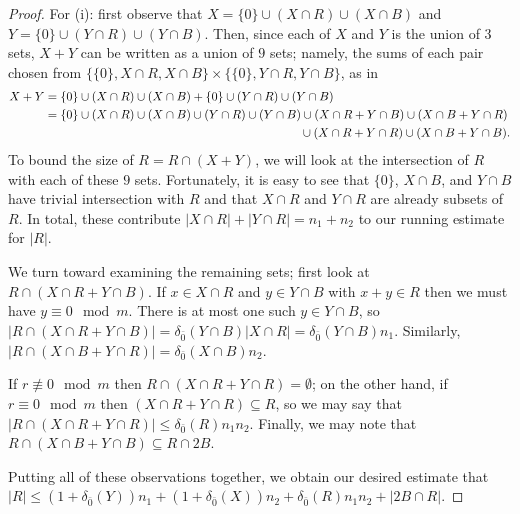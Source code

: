 \begin{proof}
For (i): first observe that $X = \{0\}\cup (X\cap R) \cup (X\cap B)$ and $Y = \{0\}\cup (Y\cap R) \cup (Y\cap B)$.
Then, since each of $X$ and $Y$ is the union of $3$ sets, $X+Y$ can be written as a union of $9$ sets; namely, the sums of each pair chosen from $\{\{0\}, X\cap R, X\cap B\} \times \{ \{0\}, Y\cap R, Y\cap B\}$, as in
\begin{align*}
X+Y &= \{0\}\cup (X\cap R) \cup (X\cap B) + \{0\} \cup (Y\cap R) \cup (Y\cap B) \\
&= \{0\}\cup (X\cap R) \cup (X\cap B) \cup (Y\cap R) \cup (Y\cap B) \cup (X\cap R + Y\cap B) \cup (X\cap B + Y\cap R)\\
& \hspace{7.5cm} \hfill \cup (X\cap R + Y\cap R) \cup (X\cap B + Y\cap B).
\end{align*}
To bound the size of $R = R\cap (X+Y)$, we will look at the intersection of $R$ with each of these $9$ sets.  
Fortunately, it is easy to see that $\{0\}$, $X\cap B$, and $Y\cap B$ have trivial intersection with $R$ and that $X\cap R$ and $Y\cap R$ are already subsets of $R$.
In total, these contribute $|X\cap R| + |Y\cap R| = n_1+n_2$ to our running estimate for $|R|$.

We turn toward examining the remaining sets; first look at $R \cap (X\cap R + Y\cap B)$.
If $x\in X\cap R$ and $y\in Y\cap B$ with $x+y\in R$ then we must have $y\equiv 0 \mod m$.
There is at most one such $y\in Y\cap B$, so $|R\cap (X\cap R + Y\cap B)| =\delta_{\bar{0}}(Y\cap B)|X\cap R|=\delta_{\bar{0}}(Y\cap B)n_1$.
Similarly, $|R\cap (X\cap B + Y\cap R)| = \delta_{\bar{0}}(X\cap B)n_2$.

If $r\not\equiv 0 \mod m$ then $R \cap (X\cap R + Y\cap R) =\emptyset$; on the other hand, if $r\equiv 0 \mod m$ then $(X\cap R+Y\cap R)\subseteq R$, so we may say that $|R\cap (X\cap R + Y\cap R)| \le \delta_{\bar{0}}(R) n_1n_2$.
Finally, we may note that $R\cap (X\cap B + Y\cap B) \subseteq R\cap 2B$.

Putting all of these observations together, we obtain our desired estimate that $|R| \le (1+\delta_{\bar{0}}(Y))n_1 + (1+\delta_{\bar{0}}(X))n_2 + \delta_{\bar{0}}(R)n_1n_2 + |2B \cap R|$.


\end{proof}
